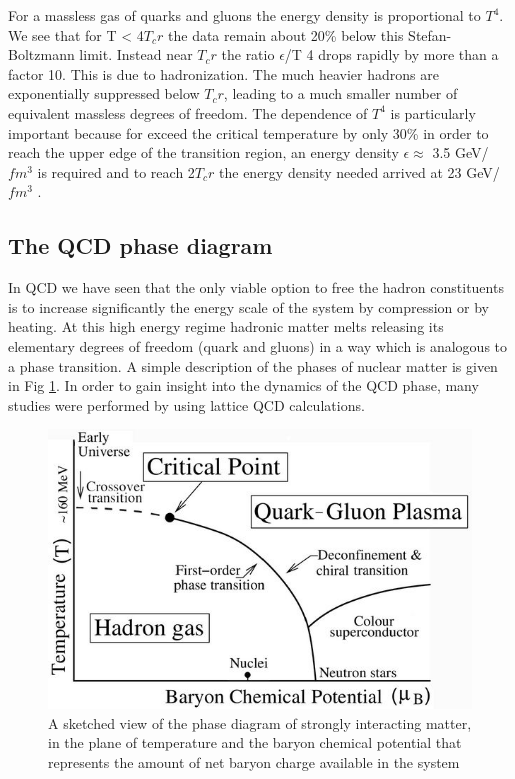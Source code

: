 \documentclass[12pt,a4paper]{book}
\begin{document}
	For a massless gas of quarks and gluons the energy density is proportional to $T^4$.  We see that for T < 4$T_cr$ the data remain about 20\% below this Stefan-Boltzmann	limit. Instead near $T_cr$ the ratio $\epsilon$/T 4 drops rapidly by more than a factor 10. This is due to hadronization. The much heavier hadrons are exponentially suppressed below $T_cr$, leading to a much smaller number of equivalent massless degrees of freedom. The dependence of $T^4$ is particularly important because for exceed the critical temperature by only 30\% in order to reach the upper edge of the transition region, an energy density $\epsilon \approx$  3.5 GeV/$fm^3$ is required and to reach 2$T_cr$ the energy density needed arrived at 23 GeV/$fm^3$ \cite{heinz2004conceptsheavyionphysics}.
	
	\subsection{The QCD phase diagram}
	In QCD we have seen that the only viable option to free the hadron constituents is to increase significantly the energy scale of the system by compression or by heating. At this high energy regime hadronic matter melts releasing its elementary degrees of freedom (quark and gluons) in a way which is analogous to a phase transition. A simple description of the phases of nuclear matter is given in Fig \ref{fig:QCD_phase_diagram}. In order to gain insight	into the dynamics of the QCD phase, many studies were performed by using lattice QCD	calculations. 
	\begin{figure}[ht]
		\centering
		\includegraphics[width=0.7\linewidth]{pictures/QCD_phase_diagram.jpg}
		\caption{A sketched view of the phase diagram of strongly interacting matter, in the plane of temperature and the baryon chemical potential that represents the amount of net baryon charge available in the system}
		\label{fig:QCD_phase_diagram} 
	\end{figure}
\end{document}
